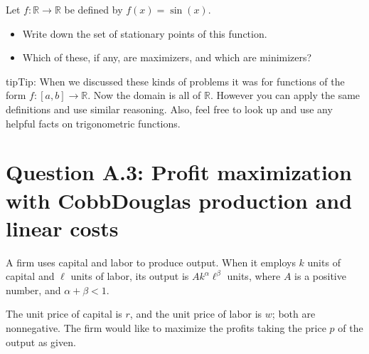 \documentclass[letterpaper,10pt,english]{jupyterBook}
\begin{document}
\sphinxAtStartPar
{}

\sphinxAtStartPar
Let \(f \colon \mathbb{R} \to \mathbb{R}\) be defined by \(f(x) = \sin(x)\).
\begin{itemize}
\item {} 
\sphinxAtStartPar
Write down the set of stationary points of this function.

\item {} 
\sphinxAtStartPar
Which of these, if any, are maximizers, and which are minimizers?

\end{itemize}

\begin{sphinxadmonition}{tip}{Tip:}
\sphinxAtStartPar
When we discussed these kinds of problems it was for functions of the form \(f \colon [a, b] \to \mathbb{R}\).  Now the domain is all of \(\mathbb{R}\).
However you can apply the same definitions and use similar reasoning.  Also, feel free to look up and use any helpful facts on trigonometric functions.
\end{sphinxadmonition}


\section{Question A.3: Profit maximization with Cobb\sphinxhyphen{}Douglas production and linear costs}
\label{\detokenize{02.exercises.A:question-a-3-profit-maximization-with-cobb-douglas-production-and-linear-costs}}
\sphinxAtStartPar
A firm uses capital and labor to produce output.
When it employs \(k\) units of capital and \(\ell\) units of labor, its output is \(A k^{\alpha} \ell^{\beta}\) units, where \(A\) is a positive number, and \(\alpha + \beta < 1\).

\sphinxAtStartPar
The unit price of capital is \(r\), and the unit price of labor is \(w\); both are non\sphinxhyphen{}negative.
The firm would like to maximize the profits taking the price \(p\) of the output as given.
\end{document}
